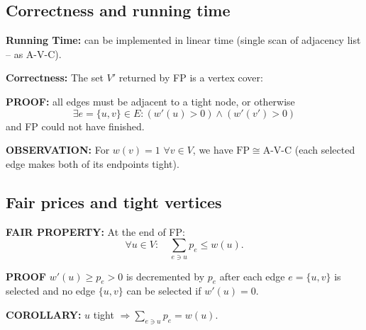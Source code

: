 \subsection{Correctness and running time}
\textbf{Running Time:} can be implemented in linear time (single scan of adjacency list -- as A-V-C).

\textbf{Correctness:} The set $V'$ returned by FP is a vertex cover:

\textbf{PROOF:} all edges must be adjacent to a tight node, or otherwise
\[\exists e=\{u,v\}\in E:(w'(u)>0)\land(w'(v')>0)\]
and FP could not have finished.

\textbf{OBSERVATION:} For $w(v)=1$ $\forall v\in V$, we have $\mathrm{FP}\cong\mathrm{A\text{-}V\text{-}C}$ (each selected edge makes both of its endpoints tight).
\subsection{Fair prices and tight vertices}
\begin{notesresult}
\textbf{FAIR PROPERTY:} At the end of FP:
\[\forall u\in V:\quad\sum_{e\ni u}p_e\leq w(u).\]
\end{notesresult}
\textbf{PROOF} $w'(u)\geq p_e>0$ is decremented by $p_e$ after each edge $e=\{u,v\}$ is selected and no edge $\{u,v\}$ can be selected if $w'(u)=0$.
\begin{notesresult}
\textbf{COROLLARY:} $u$ tight $\Rightarrow\sum_{e\ni u}p_e=w(u)$.
\end{notesresult}
